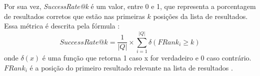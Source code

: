 Por sua vez, \textit{SuccessRate@k} é um valor, entre 0 e 1, que representa a porcentagem de resultados corretos que estão nas primeiras $k$ posições da lista de resultados. Essa métrica é descrita pela fórmula \cite{Wan2019MultimodalAN}:
\begin{equation*}
    SuccessRate@k=\frac{1}{|Q|} \times \sum_{i=1}^{|Q|} \delta(FRank_i \geq k)
\end{equation*}
onde $\delta(x)$ é uma função que retorna 1 caso x for verdadeiro e 0 caso contrário. $FRank_i$ é a posição do primeiro resultado relevante na lista de resultados \cite{Raghothaman2016SWIMSW}.


